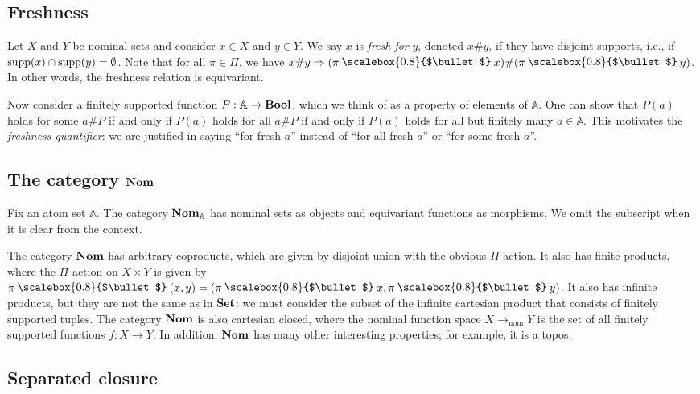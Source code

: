 \documentclass[11pt,a4paper]{amsart}
\theoremstyle{plain}
\theoremstyle{definition}
\theoremstyle{remark}
\newcommand{\PI}{\Pi}
\newcommand{\Nom}{\textrm{\bf Nom}}
\newcommand{\NomX}[1]{\Nom_{#1}}
\newcommand{\NomA}{\NomX{\aA}}
\newcommand{\Set}{\textrm{\bf Set}}
\newcommand{\aA}{\mathbb{A}}
\newcommand{\Bool}{\textrm{\bf{Bool}}}
\newcommand{\NFS}[2]{#1\to_{\text{nom}}#2}
\newcommand{\supp}{\mathop{\text{\rm supp}}}
\let\oldbullet\bullet
\newcommand{\action}{\mathbin{\text{\raisebox{0.15ex}{\scalebox{0.8}{$\oldbullet$}}}}}
\newcommand{\bul}{\action}
\begin{document}
\subsection{Freshness}

Let $X$ and $Y$ be nominal sets and consider $x\in X$ and $y\in Y$. We
say $x$ is \emph{fresh for} $y$, denoted $x\# y$, if they have
disjoint supports, i.e., if $\supp(x) \cap \supp(y) = \emptyset$.
Note that for all $\pi \in \PI$, we have $x\# y \Rightarrow (\pi
\bul x) \# (\pi \bul y)$. In other words, the freshness relation
is equivariant.

Now consider a finitely supported function $P:\aA\to \Bool$, which we
think of as a property of elements of $\aA$. One can show that $P(a)$
holds for some $a\# P$ if and only if $P(a)$ holds for all $a\# P$ if
and only if $P(a)$ holds for all but finitely many $a\in\aA$. This
motivates the \emph{freshness quantifier}: we are justified in saying
``for fresh $a$'' instead of ``for all fresh $a$'' or ``for some
fresh $a$''.

\subsection{The category $\Nom$}

Fix an atom set $\aA$. The category $\NomA$ has nominal sets as objects
and equivariant functions as morphisms. We omit the subscript when
it is clear from the context.

The category $\Nom$ has arbitrary coproducts, which are given by
disjoint union with the obvious $\PI$-action. It also has finite
products, where the $\PI$-action on $X\times Y$ is given by
$\pi\bul(x,y) = (\pi\bul x, \pi\bul y)$. It also has infinite
products, but they are not the same as in $\Set$: we must consider the
subset of the infinite cartesian product that consists of finitely
supported tuples. The category $\Nom$ is also cartesian closed, where
the nominal function space $\NFS{X}{Y}$ is the set of all finitely
supported functions $f:X\to Y$. In addition, $\Nom$ has many other
interesting properties; for example, it is a topos.

\subsection{Separated closure}
\end{document}

